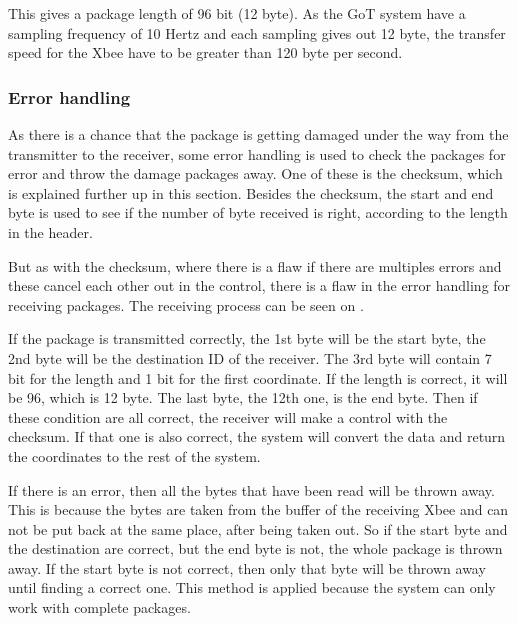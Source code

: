 This gives a package length of 96 bit (12 byte). As the GoT system have a sampling frequency of 10 Hertz and each sampling gives out 12 byte, the transfer speed for the Xbee have to be greater than 120 byte per second. 

\subsubsection{Error handling}
As there is a chance that the package is getting damaged under the way from the transmitter to the receiver, some error handling is used to check the packages for error and throw the damage packages away. One of these is the checksum, which is explained further up in this section. Besides the checksum, the start and end byte is used to see if the number of byte received is right, according to the length in the header.

But as with the checksum, where there is a flaw if there are multiples errors and these cancel each other out in the control, there is a flaw in the error handling for receiving packages. The receiving process can be seen on .


If the package is transmitted correctly, the 1st byte will be the start byte, the 2nd byte will be the destination ID of the receiver. The 3rd byte will contain 7 bit for the length and 1 bit for the first coordinate. If the length is correct, it will be 96, which is 12 byte. The last byte, the 12th one, is the end byte. Then if these condition are all correct, the receiver will make a control with the checksum. If that one is also correct, the system will convert the data and return the coordinates to the rest of the system.

If there is an error, then all the bytes that have been read will be thrown away. This is because the bytes are taken from the buffer of the receiving Xbee and can not be put back at the same place, after being taken out. So if the start byte and the destination are correct, but the end byte is not, the whole package is thrown away. If the start byte is not correct, then only that byte will be thrown away until finding a correct one. This method is applied because the system can only work with complete packages.

